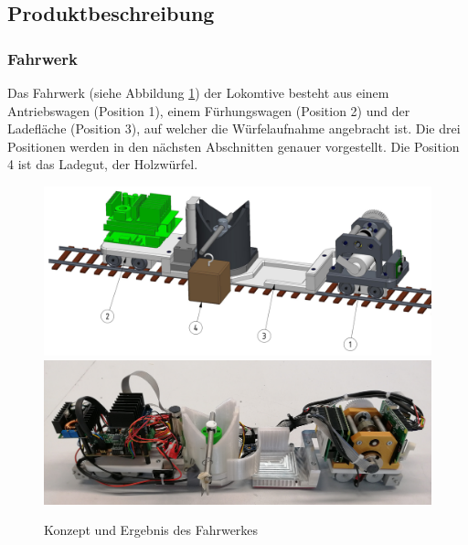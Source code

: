 \documentclass[../../main.tex]{subfiles}
\begin{document}

\subsection{Produktbeschreibung}

\subsubsection{Fahrwerk} \label{mt_Fahrwerk}

Das Fahrwerk (siehe Abbildung \ref{fig:konzeptfahrwerk}) der Lokomtive besteht aus einem Antriebswagen (Position 1), einem Fürhungswagen (Position 2) und der Ladefläche (Position 3), auf welcher die Würfelaufnahme angebracht ist. Die drei Positionen werden in den nächsten Abschnitten genauer vorgestellt. Die Position 4 ist das Ladegut, der Holzwürfel.\\

\begin{figure}[H]
   \centering
   \includegraphics[width=.95\textwidth]{../../images/Maschinentechnik/lokomotive.PNG}
   \includegraphics[width=.95\textwidth]{../../images/Maschinentechnik/lokomotive2.PNG}
   \caption {Konzept und Ergebnis des Fahrwerkes}
   \label{fig:konzeptfahrwerk}
\end{figure}
\end{document}
